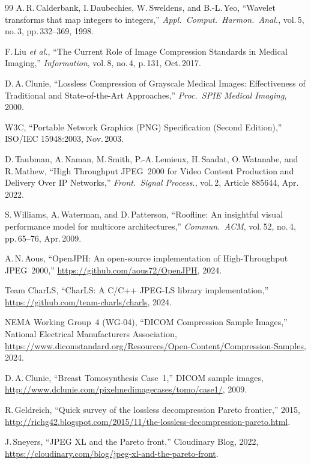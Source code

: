 \documentclass[journal]{IEEEtran}
\begin{document}
\begin{thebibliography}{99}
A.\,R.\,Calderbank, I.\,Daubechies, W.\,Sweldens, and B.-L.\,Yeo,
``Wavelet transforms that map integers to integers,''
\textit{Appl.\ Comput.\ Harmon.\ Anal.}, vol.\,5, no.\,3, pp.\,332--369, 1998.


F.\,Liu \textit{et al.},
``The Current Role of Image Compression Standards in Medical Imaging,''
\textit{Information}, vol.\,8, no.\,4, p.\,131, Oct.\,2017.

D.\,A.\,Clunie,
``Lossless Compression of Grayscale Medical Images: Effectiveness of
Traditional and State-of-the-Art Approaches,''
\textit{Proc.\ SPIE Medical Imaging}, 2000.

W3C, ``Portable Network Graphics (PNG) Specification (Second Edition),''
ISO/IEC 15948:2003, Nov.\,2003.

D.\,Taubman, A.\,Naman, M.\,Smith, P.-A.\,Lemieux, H.\,Saadat, O.\,Watanabe,
and R.\,Mathew,
``High Throughput JPEG~2000 for Video Content Production and Delivery Over IP
Networks,''
\textit{Front.\ Signal Process.}, vol.\,2, Article 885644, Apr.\,2022.

S.\,Williams, A.\,Waterman, and D.\,Patterson,
``Roofline: An insightful visual performance model for multicore
architectures,''
\textit{Commun.\ ACM}, vol.\,52, no.\,4, pp.\,65--76, Apr.\,2009.

A.\,N.\,Aous,
``OpenJPH: An open-source implementation of High-Throughput JPEG~2000,''
\url{https://github.com/aous72/OpenJPH}, 2024.

Team CharLS,
``CharLS: A C/C++ JPEG-LS library implementation,''
\url{https://github.com/team-charls/charls}, 2024.

NEMA Working Group~4 (WG-04),
``DICOM Compression Sample Images,''
National Electrical Manufacturers Association,
\url{https://www.dicomstandard.org/Resources/Open-Content/Compression-Samples},
2024.

D.\,A.\,Clunie,
``Breast Tomosynthesis Case~1,'' DICOM sample images,
\url{http://www.dclunie.com/pixelmedimagecases/tomo/case1/}, 2009.

R.\,Geldreich, ``Quick survey of the lossless decompression Pareto frontier,''
2015, \url{http://richg42.blogspot.com/2015/11/the-lossless-decompression-pareto.html}.

J.\,Sneyers, ``JPEG XL and the Pareto front,'' Cloudinary Blog, 2022,
\url{https://cloudinary.com/blog/jpeg-xl-and-the-pareto-front}.


\end{thebibliography}
\end{document}
